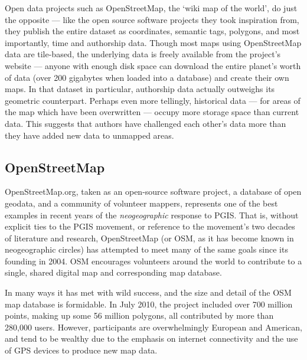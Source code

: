 \documentclass[11pt,oneside,notitlepage]{report}
\begin{document}
{{Open data projects such as OpenStreetMap, the `wiki map of the world', do just the opposite --- like the open source software projects they took inspiration from, they publish the entire dataset as coordinates, semantic tags, polygons, and most importantly, time and authorship data. Though most maps using OpenStreetMap data are tile-based, the underlying data is freely available from the project's website --- anyone with enough disk space can download the entire planet's worth of data (over 200 gigabytes when loaded into a database) and create their own maps. In that dataset in particular, authorship data actually outweighs its geometric counterpart. Perhaps even more tellingly, historical data --- for areas of the map which have been overwritten --- occupy more storage space than current data. This suggests that authors have challenged each other's data more than they have added new data to unmapped areas. \cite{warren2009composition}
  
\subsection{OpenStreetMap}
\label{sec:openstreetmap}

OpenStreetMap.org, taken as an open-source software project, a database of open geodata, and a community of volunteer mappers, represents one of the best examples in recent years of the \emph{neogeographic} response to \ac{PGIS}. That is, without explicit ties to the \ac{PGIS} movement, or reference to the movement's two decades of literature and research, OpenStreetMap (or OSM, as it has become known in neogeographic circles) has attempted to meet many of the same goals since its founding in 2004. OSM encourages volunteers around the world to contribute to a single, shared digital map and corresponding map database. \cite{chilton-crowdsourcing} 

In many ways it has met with wild success, and the size and detail of the OSM map database is formidable. In July 2010, the project included over 700 million points, making up some 56 million polygons, all contributed by more than 280,000 users. \cite{osm2010stats} However, participants are overwhelmingly European and American, and tend to be wealthy due to the emphasis on internet connectivity and the use of GPS devices to produce new map data.

}}
\end{document}
